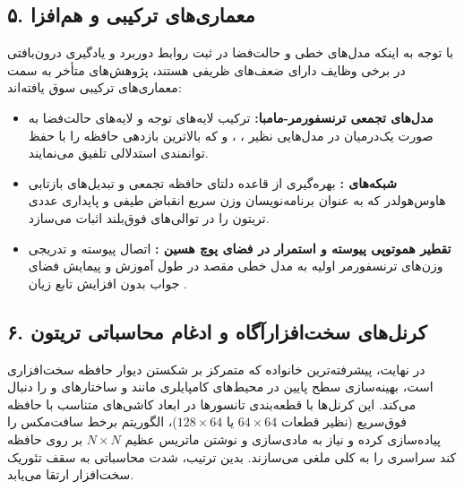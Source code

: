 \documentclass[12pt,a4paper]{report}
\theoremstyle{definition}
\begin{document}
\subsection{۵. معماری‌های ترکیبی و هم‌افزا }
با توجه به اینکه مدل‌های خطی و حالت‌فضا در ثبت روابط دوربرد و یادگیری درون‌بافتی  در برخی وظایف دارای ضعف‌های ظریفی هستند، پژوهش‌های متأخر به سمت معماری‌های ترکیبی سوق یافته‌اند:
\begin{itemize}
    \item \textbf{مدل‌های تجمعی ترنسفورمر-مامبا:} ترکیب لایه‌های توجه و لایه‌های حالت‌فضا به صورت یک‌درمیان در مدل‌هایی نظیر  \cite{lieber2024jamba}،  \cite{ren2024samba}،  \cite{de2024griffin} و  \cite{dong2024hymba} که بالاترین بازدهی حافظه را با حفظ توانمندی استدلالی تلفیق می‌نمایند.
    \item \textbf{شبکه‌های :} بهره‌گیری از قاعده دلتای حافظه تجمعی و تبدیل‌های بازتابی هاوس‌هولدر  که به عنوان برنامه‌نویسان وزن سریع \cite{schlag2021linear} انقباض طیفی و پایداری عددی تریتون را در توالی‌های فوق‌بلند اثبات می‌سازد.
    \item \textbf{تقطیر هموتوپی پیوسته  و استمرار در فضای پوچ هسین :} اتصال پیوسته و تدریجی وزن‌های ترنسفورمر اولیه به مدل خطی مقصد در طول آموزش و پیمایش فضای جواب بدون افزایش تابع زیان \cite{huang2026hnc}.
\end{itemize}

\subsection{۶. کرنل‌های سخت‌افزارآگاه و ادغام محاسباتی تریتون }
در نهایت، پیشرفته‌ترین خانواده که متمرکز بر شکستن دیوار حافظه سخت‌افزاری است، بهینه‌سازی سطح پایین در محیط‌های کامپایلری مانند  و ساختارهای  \cite{dao2022flashattention} و  \cite{dao2023flashattention2} را دنبال می‌کند. این کرنل‌ها با قطعه‌بندی تانسورها در ابعاد کاشی‌های متناسب با حافظه فوق‌سریع  (نظیر قطعات $64 \times 64$ یا $128 \times 64$)، الگوریتم برخط سافت‌مکس  را پیاده‌سازی کرده و نیاز به مادی‌سازی و نوشتن ماتریس عظیم $N \times N$ بر روی حافظه کند سراسری  را به کلی ملغی می‌سازند. بدین ترتیب، شدت محاسباتی به سقف تئوریک سخت‌افزار ارتقا می‌یابد.
\end{document}
